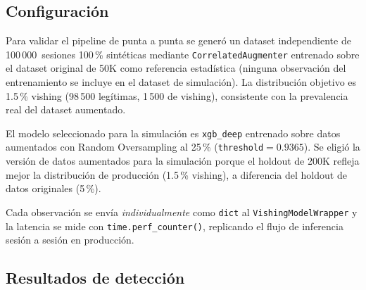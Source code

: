 \documentclass[journal]{IEEEtran}
\newcommand{\wrapcls}{\texttt{VishingModelWrapper}}
\newcommand{\augcls}{\texttt{CorrelatedAugmenter}}
\begin{document}
\subsection{Configuración}

Para validar el pipeline de punta a punta se generó un dataset independiente
de 100\,000~sesiones 100\,\% sintéticas mediante \augcls{} entrenado sobre el
dataset original de 50K como referencia estadística (ninguna observación del
entrenamiento se incluye en el dataset de simulación). La distribución objetivo
es 1.5\,\% vishing (98\,500 legítimas, 1\,500 de vishing), consistente con la
prevalencia real del dataset aumentado.

El modelo seleccionado para la simulación es \texttt{xgb\_deep} entrenado sobre
datos aumentados con Random Oversampling al 25\,\%
(\texttt{threshold}$=0.9365$). Se eligió la versión de datos aumentados para
la simulación porque el holdout de 200K refleja mejor la distribución de
producción (1.5\,\% vishing), a diferencia del holdout de datos originales
(5\,\%).

Cada observación se envía \emph{individualmente} como \texttt{dict} al
\wrapcls{} y la latencia se mide con \texttt{time.perf\_counter()},
replicando el flujo de inferencia sesión a sesión en producción.

\subsection{Resultados de detección}
\end{document}
